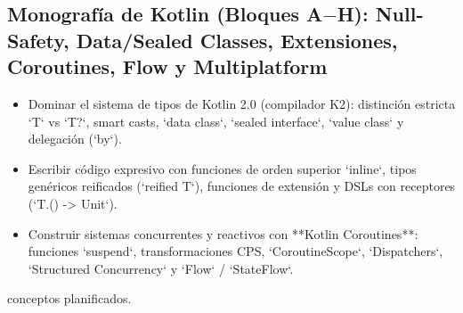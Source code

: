\documentclass{book}
\begin{document}
\subsection*{\checkmark Monografía de Kotlin (Bloques A\(-\)H): Null-Safety, Data/Sealed Classes, Extensiones, Coroutines, Flow y Multiplatform}
\begin{itemize}
\item Dominar el sistema de tipos de Kotlin 2.0 (compilador K2): distinción estricta `T` vs `T?`, smart casts, `data class`, `sealed interface`, `value class` y delegación (`by`).
\item Escribir código expresivo con funciones de orden superior `inline`, tipos genéricos reificados (`reified T`), funciones de extensión y DSLs con receptores (`T.() -> Unit`).
\item Construir sistemas concurrentes y reactivos con **Kotlin Coroutines**: funciones `suspend`, transformaciones CPS, `CoroutineScope`, `Dispatchers`, `Structured Concurrency` y `Flow` / `StateFlow`.
\end{itemize}
 conceptos planificados.
\end{document}
